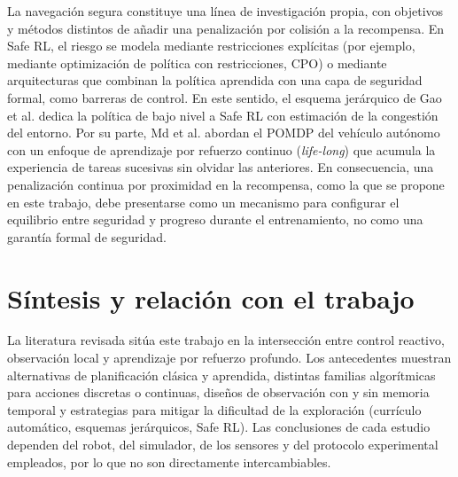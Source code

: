 La navegación segura constituye una línea de investigación propia, con
objetivos y métodos distintos de añadir una penalización por colisión a la
recompensa. En Safe RL, el riesgo se modela mediante restricciones
explícitas (por ejemplo, mediante optimización de política con
restricciones, CPO) o mediante arquitecturas que combinan la política
aprendida con una capa de seguridad formal, como barreras de control. En
este sentido, el esquema jerárquico de Gao et al.
\citep{gao2025hierarchical} dedica la política de bajo nivel a Safe RL con
estimación de la congestión del entorno. Por su parte, Md et al.
\citep{md2024novel} abordan el POMDP del vehículo autónomo con un enfoque
de aprendizaje por refuerzo continuo (\textit{life-long}) que acumula la
experiencia de tareas sucesivas sin olvidar las anteriores. En
consecuencia, una penalización continua por proximidad en la recompensa,
como la que se propone en este trabajo, debe presentarse como un
mecanismo para configurar el equilibrio entre seguridad y progreso durante
el entrenamiento, no como una garantía formal de seguridad.

\section{Síntesis y relación con el trabajo}
La literatura revisada sitúa este trabajo en la intersección entre control
reactivo, observación local y aprendizaje por refuerzo profundo. Los
antecedentes muestran alternativas de planificación clásica y aprendida,
distintas familias algorítmicas para acciones discretas o continuas,
diseños de observación con y sin memoria temporal y estrategias para
mitigar la dificultad de la exploración (currículo automático, esquemas
jerárquicos, Safe RL). Las conclusiones de cada estudio dependen del
robot, del simulador, de los sensores y del protocolo experimental
empleados, por lo que no son directamente intercambiables.

%

